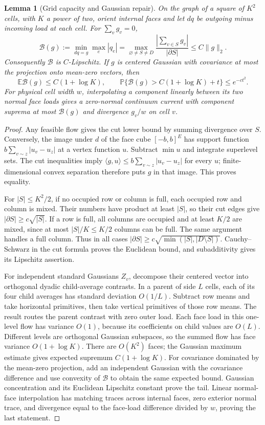 \documentclass[11pt]{article}
\newtheorem{lemma}[theorem]{Lemma}
\newcommand{\E}{\mathbb E}
\newcommand{\PP}{\mathbb P}
\numberwithin{equation}{section}
\begin{document}
\begin{lemma}[Grid capacity and Gaussian repair]\label{lem:local-grid-capacity}
On the graph of a square of $K^2$ cells, with $K$ a power of two, orient internal faces and let
$dq$ be outgoing minus incoming load at each cell. For $\sum_vg_v=0$,
\[
 \mathcal B(g):=\min_{dq=g}\max_e|q_e|
 =\max_{\varnothing\ne S\ne D}
      \frac{|\sum_{v\in S}g_v|}{|\partial S|}
 \le C\|g\|_2.
\]
Consequently $\mathcal B$ is $C$-Lipschitz. If $g$ is centered Gaussian
with covariance at most the projection onto mean-zero vectors, then
\[
 \E\mathcal B(g)\le C(1+\log K),\qquad
 \PP\{\mathcal B(g)>C(1+\log K)+t\}\le e^{-ct^2}.
\]
For physical cell width $w$, interpolating a component linearly between
its two normal face loads gives a zero-normal continuum current with
component suprema at most $\mathcal B(g)$ and divergence $g_v/w$ on cell
$v$.
\end{lemma}
\begin{proof}
Any feasible flow gives the cut lower bound by summing divergence over
$S$. Conversely, the image under $d$ of the face cube $[-b,b]^E$ has
support function $b\sum_{v\sim z}|u_v-u_z|$ at a vertex function $u$.
Subtract $\min u$ and integrate superlevel sets. The cut inequalities
imply $\langle g,u\rangle\le b\sum_{v\sim z}|u_v-u_z|$ for every $u$;
finite-dimensional convex separation therefore puts $g$ in that image.
This proves equality.

For $|S|\le K^2/2$, if no occupied row or column is full, each occupied
row and column is mixed. Their numbers have product at least $|S|$,
so their cut edges give $|\partial S|\ge c\sqrt{|S|}$. If a row is full,
all columns are occupied and at least $K/2$ are mixed, since at most
$|S|/K\le K/2$ columns can be full. The same argument handles a full
column. Thus in all cases
$|\partial S|\ge c\sqrt{\min(|S|,|D\setminus S|)}$.
Cauchy--Schwarz in the cut formula proves the Euclidean bound, and
subadditivity gives its Lipschitz assertion.

For independent standard Gaussians $Z_v$, decompose their centered
vector into orthogonal dyadic child-average contrasts. In a parent of
side $L$ cells, each of its four child averages has standard deviation
$O(1/L)$. Subtract row means and take horizontal primitives, then take
vertical primitives of those row means. The result routes the parent
contrast with zero outer load. Each face load in this one-level flow
has variance $O(1)$, because its coefficients on child values are
$O(L)$. Different levels are orthogonal Gaussian subspaces, so the
summed flow has face variance $O(1+\log K)$. There are $O(K^2)$ faces;
the Gaussian maximum estimate gives expected supremum $C(1+\log K)$.
For covariance dominated by the mean-zero projection, add an independent
Gaussian with the covariance difference and use convexity of
$\mathcal B$ to obtain the same expected bound. Gaussian concentration
and its Euclidean Lipschitz constant prove the tail. Linear normal-face
interpolation has matching traces across internal faces, zero exterior
normal trace, and divergence equal to the face-load difference divided
by $w$, proving the last statement.
\end{proof}
\end{document}
